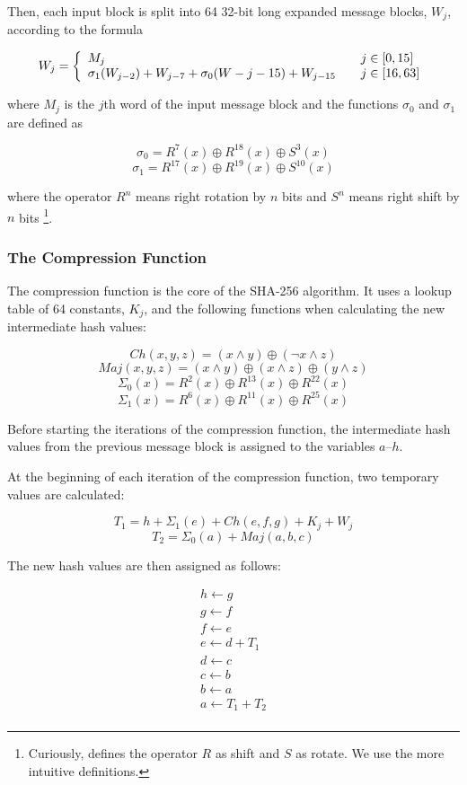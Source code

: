 Then, each input block is split into 64 32-bit long expanded message blocks, $W_j$,
according to the formula

\[ W_j = \left\{
	\begin{array}{l l}
		M_j & \quad j \in \left[0, 15\right]\\
		\sigma_1(W_{j - 2}) + W_{j - 7} + \sigma_0(W-{j - 15}) + W_{j - 15} & \quad j \in \left[16, 63\right]
	\end{array}
\right.\]

\noindent where $M_j$ is the $j$th word of the input message block and the functions
$\sigma_0$ and $\sigma_1$ are defined as

\[\sigma_0 = R^7(x) \oplus R^{18}(x) \oplus S^3(x)\]
\[\sigma_1 = R^{17}(x) \oplus R^{19}(x) \oplus S^{10}(x)\]

\noindent where the operator $R^n$ means right rotation by $n$ bits and $S^n$ means right shift by $n$
bits \footnote{Curiously, \cite{sha-spec} defines the operator $R$ as shift and $S$ as rotate.
We use the more intuitive definitions.}.

\subsubsection{The Compression Function}
The compression function is the core of the SHA-256 algorithm. It uses a lookup table
of 64 constants, $K_j$, and the following functions when calculating the new intermediate
hash values:

\[Ch(x,y,z) = (x \wedge y) \oplus (\neg x \wedge z)\]
\[Maj(x, y, z) = (x \wedge y) \oplus (x \wedge z) \oplus (y \wedge z)\]
\[\Sigma_0(x) = R^2(x) \oplus R^{13}(x) \oplus R^{22}(x)\]
\[\Sigma_1(x) = R^6(x) \oplus R^{11}(x) \oplus R^{25}(x)\]

Before starting the iterations of the compression function, the intermediate
hash values from the previous message block is assigned to the variables $a$--$h$.

At the beginning of each iteration of the compression function, two temporary
values are calculated:

\[T_1 = h + \Sigma_1(e) + Ch(e, f, g) + K_j + W_j\]
\[T_2 = \Sigma_0(a) + Maj(a, b, c)\]

The new hash values are then assigned as follows:

\[\begin{array}{l}
	h \leftarrow g \\
	g \leftarrow f \\
	f \leftarrow e \\
	e \leftarrow d + T_1\\
	d \leftarrow c \\
	c \leftarrow b \\
	b \leftarrow a \\
	a \leftarrow T_1 + T_2 \\
\end{array}\]


